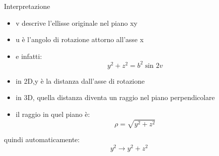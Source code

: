 \documentclass[a4paper,14pt]{article}
\begin{document}
Interpretazione
\begin{itemize}
\item v descrive l’ellisse originale nel piano  xy
\item u è l’angolo di rotazione attorno all’asse x
\item e infatti:
\[y^2+z^2=b^2\sin^⁡2v\]
\end{itemize}

\begin{itemize}
\item in 2D,y è la distanza dall’asse di rotazione
\item in 3D, quella distanza diventa un raggio nel piano perpendicolare
\item il raggio in quel piano è:
\[\rho=\sqrt{y^2+z^2}\]
\end{itemize}
quindi automaticamente:
\[y^2\rightarrow y^2+z^2\]
\end{document}
